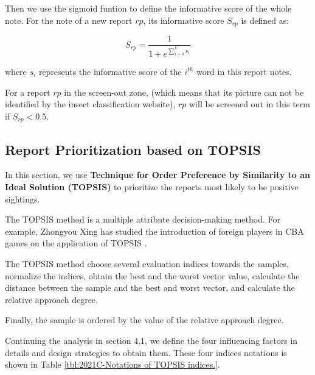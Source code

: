 Then we use the sigmoid funtion to define the informative score of the whole note. For the note of a new report $rp$, its informative score $S_{rp}$ is defined as:

\begin{equation*}
    S_{rp} = \frac{1}{1+e^{\sum_{i=0}^k s_i}}
\end{equation*}

where $s_i$ represents the informative score of the $i^{th}$ word in this report notes. 

For a report $rp$ in the screen-out zone, (which means that its picture can not be identified by the insect classification website), $rp$ will be screened out in this term if $S_{rp}<0.5$.


\subsection{Report Prioritization based on TOPSIS}
In this section, we use \textbf{Technique for Order Preference by Similarity to an Ideal Solution (TOPSIS)} to prioritize the reports most likely to be positive sightings.

The TOPSIS method \parencite{TOPSIS} is a multiple attribute decision-making method. For example, Zhongyou Xing has studied the introduction of foreign players in CBA games on the application of TOPSIS \parencite{TOPSIS-CBA}.

The TOPSIS method choose several evaluation indices towards the samples, normalize the indices, obtain the best and the worst vector value, calculate the distance between the sample and the best and worst vector, and calculate the relative approach degree.

Finally, the sample is ordered by the value of the relative approach degree.

Continuing the analysis in section 4.1, we define the four influencing factors in details and design strategies to obtain them. These four indices notations is shown in Table \ref{tbl:2021C-Notations of TOPSIS indices.}.

